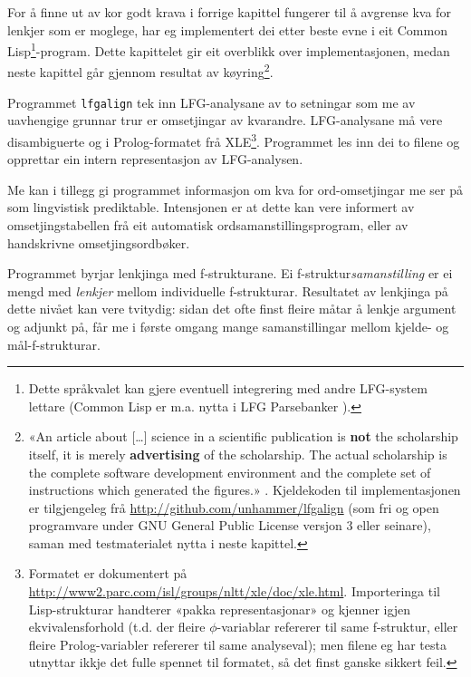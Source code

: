 \documentclass[11pt,a4paper,oneside,draft]{report}
\begin{document}
For å finne ut av kor godt krava i forrige kapittel fungerer til å
avgrense kva for lenkjer som er moglege, har eg implementert dei etter
beste evne i eit Common Lisp\footnote{Dette språkvalet kan gjere eventuell integrering med andre
        LFG-system lettare (Common Lisp er m.a. nytta i LFG
        Parsebanker \citep{rosen2009lpt}). }-program. Dette kapittelet gir eit
overblikk over implementasjonen, medan neste kapittel går gjennom
resultat av køyring\footnote{«An article about [\ldots{}] science in a scientific publication is
       \textbf{not} the scholarship itself, it is merely
       \textbf{advertising} of the scholarship. The actual scholarship
       is the complete software development environment and the
       complete set of instructions which generated the figures.»
       \citep[Jon Claerbout,~i][s.~7--8]{stodden2009err}. Kjeldekoden
       til implementasjonen er tilgjengeleg frå
       \href{http://github.com/unhammer/lfgalign}{http://github.com/unhammer/lfgalign} (som fri og open
       programvare under GNU General Public License versjon 3 eller
       seinare), saman med testmaterialet nytta i neste kapittel. }.

Programmet \texttt{lfgalign} tek inn LFG-analysane av to
setningar som me av uavhengige grunnar trur er omsetjingar av
kvarandre. LFG-analysane må vere disambiguerte og i Prolog-formatet
frå XLE\footnote{Formatet er dokumentert på
       \href{http://www2.parc.com/isl/groups/nltt/xle/doc/xle.html}{http://www2.parc.com/isl/groups/nltt/xle/doc/xle.html}. Importeringa
       til Lisp-strukturar handterer «pakka representasjonar» og
       kjenner igjen ekvivalensforhold (t.d. der fleire
       $\phi$-variablar refererer til same f-struktur, eller fleire
       Prolog-variabler refererer til same analyseval); men filene eg
       har testa utnyttar ikkje det fulle spennet til formatet, så det
       finst ganske sikkert feil. }. Programmet les inn dei to filene og opprettar ein
intern representasjon av LFG-analysen.  

Me kan i tillegg gi programmet informasjon om kva for ord-omsetjingar
me ser på som lingvistisk prediktable. Intensjonen er at dette kan
vere informert av omsetjingstabellen frå eit automatisk
ordsamanstillingsprogram, eller av handskrivne omsetjingsordbøker.

Programmet byrjar lenkjinga med f-strukturane. Ei
f-struktur\emph{samanstilling} er ei mengd med \emph{lenkjer} mellom
individuelle f-strukturar. Resultatet av lenkjinga på dette nivået kan
vere tvitydig: sidan det ofte finst fleire måtar å lenkje argument og
adjunkt på, får me i første omgang mange samanstillingar mellom
kjelde- og mål-f-strukturar.
\end{document}
